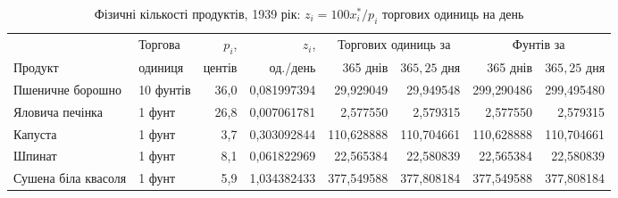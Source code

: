 \begin{table}[htbp]
\centering\footnotesize\setlength{\tabcolsep}{3pt}
\caption{Фізичні кількості продуктів, 1939 рік: $z_i=100x_i^*/p_i$ торгових одиниць на день}
\label{tab:glpk-units-1939}
\begin{tabular}{llrrrrrr}
\toprule
 & Торгова & $p_i$, & $z_i$, & \multicolumn{2}{c}{Торгових одиниць за} & \multicolumn{2}{c}{Фунтів за} \\
\cmidrule(lr){5-6}\cmidrule(lr){7-8}
Продукт & одиниця & центів & од./день & 365 днів & $365{,}25$ дня & 365 днів & $365{,}25$ дня \\
\midrule
Пшеничне борошно & 10 фунтів & 36{,}0 & 0{,}081997394 & 29{,}929049 & 29{,}949548 & 299{,}290486 & 299{,}495480 \\
Яловича печінка & 1 фунт & 26{,}8 & 0{,}007061781 & 2{,}577550 & 2{,}579315 & 2{,}577550 & 2{,}579315 \\
Капуста & 1 фунт & 3{,}7 & 0{,}303092844 & 110{,}628888 & 110{,}704661 & 110{,}628888 & 110{,}704661 \\
Шпинат & 1 фунт & 8{,}1 & 0{,}061822969 & 22{,}565384 & 22{,}580839 & 22{,}565384 & 22{,}580839 \\
Сушена біла квасоля & 1 фунт & 5{,}9 & 1{,}034382433 & 377{,}549588 & 377{,}808184 & 377{,}549588 & 377{,}808184 \\
\bottomrule
\end{tabular}
\end{table}
